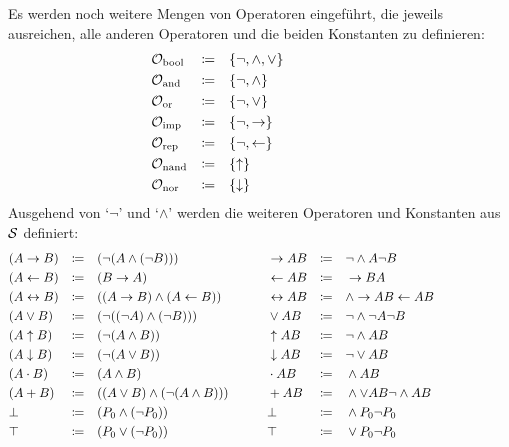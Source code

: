 \documentclass[english,ngerman,parskip=half,headsepline,footsepline,
	fleqn,notitlepage]{scrreprt}
\newcommand*{\formulatoleft}{&&&&&&&&&&}%
\newcommand*{\formulaspace}{&&&&}%
\newcommand*{\charqt}[1]{\enquote*{#1}}%
\newcommand*{\symqt}[1]{\charqt{$#1$}}%
\begin{document}
	Es werden noch weitere Mengen von Operatoren eingeführt,
	die jeweils ausreichen,
	alle anderen Operatoren und die beiden Konstanten zu definieren:
	\begin{align}
		& \asObool & \defeq & & & \{ \lnot, \land, \lor \} \label{def:Obool} \\
		& \asOand  & \defeq & & & \{ \lnot, \land       \} \label{def:Oand}  \\
		& \asOor   & \defeq & & & \{ \lnot, \lor        \} \label{def:Oor}   \\
		& \asOimp  & \defeq & & & \{ \lnot, \limp       \} \label{def:Oimp}  \\
		& \asOrep  & \defeq & & & \{ \lnot, \lrep       \} \label{def:Orep}  \\
		& \asOnand & \defeq & & & \{ \lnand             \} \label{def:Onand} \\
		& \asOnor  & \defeq & & & \{ \lnor              \} \label{def:Onor}
		\formulatoleft
	\end{align}
	Ausgehend von \symqt{\lnot} und \symqt{\land}
	werden die weiteren Operatoren und Konstanten aus $\mathcal{S}$ definiert:
	\begin{align}
		&                 (A \limp B) & \defeq & & & (\lnot (A \land (\lnot B)))
		& \formulaspace &   \limp A B & \defeq & & & \lnot \land A \lnot B
		\label{def:imp}   \\
		&                 (A \lrep B) & \defeq & & & (B \limp A)
		& \formulaspace &   \lrep A B & \defeq & & & \limp B A
		\label{def:rep}   \\
		&               (A \lequiv B) & \defeq & & & ((A\limp B)\land(A\lrep B))
		& \formulaspace & \lequiv A B & \defeq & & & \land \limp A B \lrep A B
		\label{def:equiv} \\
		&             (A \lor B) & \defeq & & & (\lnot((\lnot A)\land(\lnot B)))
		& \formulaspace &    \lor A B & \defeq & & & \lnot \land \lnot A \lnot B
		\label{def:or}    \\
		&                (A \lnand B) & \defeq & & & (\lnot (A \land B ))
		& \formulaspace &  \lnand A B & \defeq & & & \lnot \land A B
		\label{def:nand}  \\
		&                 (A \lnor B) & \defeq & & & (\lnot (A \lor B))
		& \formulaspace &   \lnor A B & \defeq & & & \lnot \lor A B
		\label{def:nor}   \\
		&                (A \lmult B) & \defeq & & & (A \land B)
		& \formulaspace &  \lmult A B & \defeq & & & \land A B
		\label{def:mult}  \\
		&           (A \ladd B) & \defeq & & & ((A\lor B)\land(\lnot(A\land B)))
		& \formulaspace &   \ladd A B & \defeq & & & \land\lor A B\lnot\land A B
		\label{def:add}   \\
		&                     \lfalse & \defeq & & & (P_0 \land (\lnot P_0))
		& \formulaspace &     \lfalse & \defeq & & & \land P_0 \lnot P_0
		\label{def:false} \\
		&                      \ltrue & \defeq & & & (P_0 \lor (\lnot P_0))
		& \formulaspace &      \ltrue & \defeq & & & \lor P_0 \lnot P_0
		\label{def:true}  \formulatoleft
	\end{align}
\end{document}
